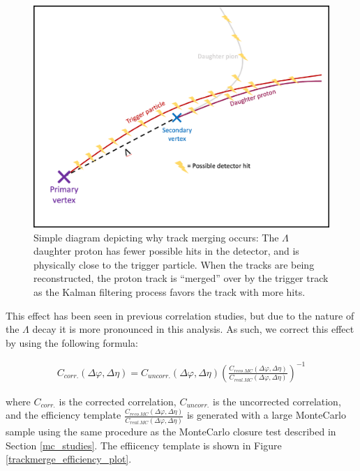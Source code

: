 \documentclass[ALICE,manyauthors]{ALICE_analysis_notes}
\begin{document}
\begin{figure}[ht]
\centering
\includegraphics[width=5in]{figures/track_merging_diagram_withborder.pdf}
\caption{Simple diagram depicting why track merging occurs: The $\Lambda$ daughter proton has fewer possible hits in the detector, and is physically close to the trigger particle. When the tracks are being reconstructed, the proton track is ``merged'' over by the trigger track as the Kalman filtering process favors the track with more hits.}
\label{trackmerge_diagram}
\end{figure}

This effect has been seen in previous correlation studies\cite{trackmerge_1}\cite{trackmerge_2}, but due to the nature of the $\Lambda$ decay it is more pronounced in this analysis. As such, we correct this effect by using the following formula:

\begin{align*}
	C_{corr.}(\Delta\varphi, \Delta\eta) = C_{uncorr.}(\Delta\varphi, \Delta\eta)(\frac{C_{reco. MC}(\Delta\varphi, \Delta\eta)}{C_{real. MC}(\Delta\varphi, \Delta\eta)})^{-1}
\end{align*}

where $C_{corr.}$ is the corrected correlation, $C_{uncorr.}$ is the uncorrected correlation, and the efficiency template $\frac{C_{reco. MC}(\Delta\varphi, \Delta\eta)}{C_{real. MC}(\Delta\varphi, \Delta\eta)}$ is generated with a large MonteCarlo sample using the same procedure as the MonteCarlo closure test described in Section \ref{mc_studies}. The effiicency template is shown in Figure \ref{trackmerge_efficiency_plot}.
\end{document}
